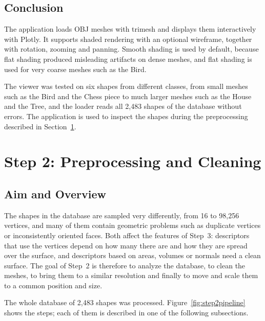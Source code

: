 \documentclass[10pt,a4paper]{article}
\begin{document}
\subsection{Conclusion}
The application loads OBJ meshes with trimesh and displays them interactively with Plotly. It supports shaded rendering with an
optional wireframe, together with rotation, zooming and panning. Smooth shading is used by default, because flat shading
produced misleading artifacts on dense meshes, and flat shading is used for very coarse meshes such as the Bird.

The viewer was tested on six shapes from different classes, from small meshes such as the Bird and the Chess piece to much
larger meshes such as the House and the Tree, and the loader reads all 2,483 shapes of the database without errors. The
application is used to inspect the shapes during the preprocessing described in Section~\ref{sec:step2}.

\section{Step 2: Preprocessing and Cleaning}\label{sec:step2}

\subsection{Aim and Overview}
The shapes in the database are sampled very differently, from 16 to 98,256 vertices, and many of them contain geometric
problems such as duplicate vertices or inconsistently oriented faces. Both affect the features of Step~3: descriptors that use
the vertices depend on how many there are and how they are spread over the surface, and descriptors based on areas, volumes or
normals need a clean surface. The goal of Step~2 is therefore to analyze the database, to clean the meshes, to bring them to a
similar resolution and finally to move and scale them to a common position and size.

The whole database of 2,483 shapes was processed. Figure~\ref{fig:step2pipeline} shows the steps; each of them is described in
one of the following subsections.
\end{document}
